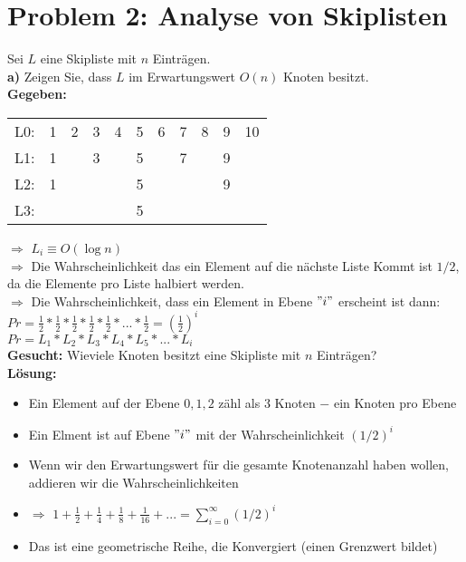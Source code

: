 \section*{{Problem 2: Analyse von Skiplisten}} 

Sei $L$ eine Skipliste mit $n$ Einträgen.\\

\textbf{a)} Zeigen Sie, dass $L$ im Erwartungswert $O(n)$ Knoten besitzt.\\

\noindent
\textbf{Gegeben:}\\

\begin{center}
\begin{tabular}{ c c c c c c c c c c c }
 L0: & 1 & 2 & 3 & 4 & 5 & 6 & 7 & 8 & 9 & 10 \\ 
 L1: & 1 &  & 3 &  & 5 &  & 7 &  & 9 &  \\   
 L2: & 1 &  &  &  & 5 &  &  &  & 9 &  \\ 
 L3: &  &  &  &  & 5 &  &  &  &  &      
\end{tabular}
\end{center}
$\Rightarrow$ $L_i \equiv O(\log n)$\\
$\Rightarrow$ Die Wahrscheinlichkeit das ein Element auf die nächste Liste Kommt ist $1/2$, da die Elemente pro Liste halbiert werden.\\
$\Rightarrow$ Die Wahrscheinlichkeit, dass ein Element in Ebene $"i"$ erscheint ist dann:\\
$Pr= \frac{1}{2} * \frac{1}{2} * \frac{1}{2} * \frac{1}{2} * \frac{1}{2} * ... * \frac{1}{2} = (\frac{1}{2})^i$\\
$Pr = L_1 * L_2 * L_3 * L_4 * L_5 * ... * L_i$\\

\textbf{Gesucht:} Wieviele Knoten besitzt eine Skipliste mit $n$ Einträgen?\\

\textbf{Lösung:}
\begin{itemize}
	\item Ein Element auf der Ebene $0,1,2$ zähl als 3 Knoten $-$ ein Knoten pro Ebene
	\item Ein Elment ist auf Ebene $"i"$ mit der Wahrscheinlichkeit $(1/2)^i$
	\item Wenn wir den Erwartungswert für die gesamte Knotenanzahl haben wollen, addieren wir die Wahrscheinlichkeiten
	\item $\Rightarrow$ $1+ \frac{1}{2} + \frac{1}{4} + \frac{1}{8} + \frac{1}{16} + ... = \sum_{i=0}^{\infty}(1/2)^i$
	\item Das ist eine geometrische Reihe, die Konvergiert (einen Grenzwert bildet)
\end{itemize}

